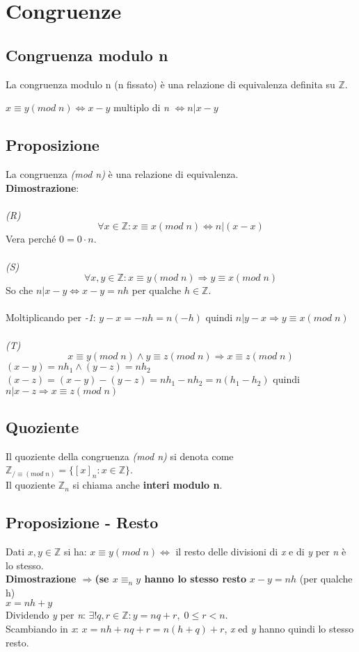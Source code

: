 \section{Congruenze}

\subsection{Congruenza modulo n}
La congruenza modulo n (n fissato) è una relazione di equivalenza definita su \(\mathbb{Z}\).

\(x\equiv y(mod\; n)\Leftrightarrow x-y\) multiplo di \textit{n} \(\Leftrightarrow n|x-y\)

\subsection{Proposizione}
La congruenza \textit{(mod n)} è una relazione di equivalenza.
\\
\textbf{Dimostrazione}:
\\\\
\textit{(R)} \[\forall x\in\mathbb{Z}: x\equiv x(mod\; n)\Leftrightarrow n|(x-x)\]
Vera perché \(0=0\cdot n\).
\\\\
\textit{(S)}
\[\forall x,y\in\mathbb{Z}: x\equiv y(mod\; n)\Rightarrow y\equiv x(mod\; n)\]
So che \(n|x-y\Leftrightarrow x-y=nh\) per qualche \(h\in\mathbb{Z}\).
\\\\
Moltiplicando per \textit{-1}: \(y-x=-nh=n(-h)\) quindi \(n|y-x\Rightarrow y\equiv x(mod\;n)\)
\\\\
\textit{(T)}
\[x\equiv y(mod\;n)\land y\equiv z(mod\;n)\Rightarrow x\equiv z(mod\;n)\]
\((x-y)=nh_1 \land (y-z)=nh_2\)
\\
\((x-z)=(x-y)-(y-z)=nh_1-nh_2=n(h_1-h_2)\) quindi \(n|x-z\Rightarrow x\equiv z(mod\;n)\)

\subsection{Quoziente}
Il quoziente della congruenza \textit{(mod n)} si denota come \(\mathbb{Z}_{/ \equiv (mod\;n)}=\{[x]_n:x\in\mathbb{Z}\}\).
\\
Il quoziente \(\mathbb{Z}_n\) si chiama anche \textbf{interi modulo n}.

\subsection{Proposizione - Resto}
Dati \(x,y\in\mathbb{Z}\) si ha: \(x\equiv y(mod\;n)\Leftrightarrow\) il resto delle divisioni di \textit{x} e di \textit{y} per \textit{n} è lo stesso.
\\
\textbf{Dimostrazione \(\Rightarrow\)(se \(x\equiv _n y\) hanno lo stesso resto}
\(x-y=nh\) (per qualche h)\\
\(x=nh+y\)\\
Dividendo \textit{y} per \textit{n}: \(\exists !q,r\in\mathbb{Z} : y=nq+r,\; 0\leq r<n\).
\\
Scambiando in \textit{x}: \(x=nh+nq+r=n(h+q)+r\), \textit{x} ed \textit{y} hanno quindi lo stesso resto.

